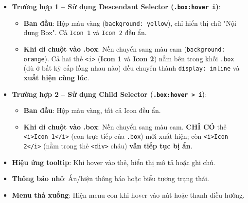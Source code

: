 \documentclass[11pt,oneside]{book}
\newcommand{\codeinline}[1]{\textcolor{accentOrange}{\texttt{#1}}}
\begin{document}
\begin{browserWindow}
\begin{itemize}[leftmargin=1.5em, itemsep=4pt, parsep=0pt]
    \item \textbf{Trường hợp 1 -- Sử dụng Descendant Selector (\codeinline{.box:hover i})}:
    \begin{itemize}[leftmargin=1.2em, itemsep=2pt]
        \item \textbf{Ban đầu}: Hộp màu vàng (\codeinline{background: yellow}), chỉ hiển thị chữ "Nội dung Box". Cả \codeinline{Icon 1} và \codeinline{Icon 2} đều ẩn.
        \item \textbf{Khi di chuột vào .box}: Nền chuyển sang màu cam (\codeinline{background: orange}). Cả hai thẻ \codeinline{<i>} (\textbf{Icon 1} và \textbf{Icon 2}) nằm bên trong khối \codeinline{.box} (dù ở bất kỳ cấp lồng nhau nào) đều chuyển thành \codeinline{display: inline} và \textbf{xuất hiện cùng lúc}.
    \end{itemize}
    \par\vspace{4pt}
    \item \textbf{Trường hợp 2 -- Sử dụng Child Selector (\codeinline{.box:hover > i})}:
    \begin{itemize}[leftmargin=1.2em, itemsep=2pt]
        \item \textbf{Ban đầu}: Hộp màu vàng, tất cả Icon đều ẩn.
        \item \textbf{Khi di chuột vào .box}: Nền chuyển sang màu cam. \textbf{CHỈ CÓ} thẻ \codeinline{<i>Icon 1</i>} (con trực tiếp của \codeinline{.box}) mới xuất hiện; còn \codeinline{<i>Icon 2</i>} (nằm trong thẻ \codeinline{<div>} cháu) \textbf{vẫn tiếp tục bị ẩn}.
    \end{itemize}
\end{itemize}
\end{browserWindow}

\begin{tipBox}
\begin{itemize}[leftmargin=1.5em, itemsep=2pt, parsep=0pt]
    \item \textbf{Hiệu ứng tooltip}: Khi hover vào thẻ, hiển thị mô tả hoặc ghi chú.
    \item \textbf{Thông báo nhỏ}: Ẩn/hiện thông báo hoặc biểu tượng trạng thái.
    \item \textbf{Menu thả xuống}: Hiện menu con khi hover vào nút hoặc thanh điều hướng.
\end{itemize}
\end{tipBox}
\end{document}
